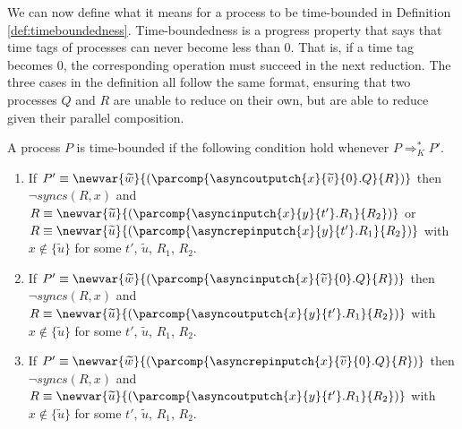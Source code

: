 We can now define what it means for a process to be time-bounded in Definition \ref{def:timeboundedness}. Time-boundedness is a progress property that says that time tags of processes can never become less than 0. That is, if a time tag becomes 0, the corresponding operation must succeed in the next reduction. The three cases in the definition all follow the same format, ensuring that two processes $Q$ and $R$ are unable to reduce on their own, but are able to reduce given their parallel composition.

\begin{defi}
    A process $P$ is time-bounded if the following condition hold whenever $P \Rightarrow^*_K P'$.
    \begin{enumerate}
        \item If $P' \equiv \newvar{\widetilde{w}}{(\parcomp{\asyncoutputch{x}{\widetilde{v}}{0}.Q}{R})}$ then $\neg syncs(R, x)$ and $R \equiv \newvar{\widetilde{u}}{(\parcomp{\asyncinputch{x}{y}{t'}.R_1}{R_2})}$ or $R \equiv \newvar{\widetilde{u}}{(\parcomp{\asyncrepinputch{x}{y}{t'}.R_1}{R_2})}$ with $x \not\in \{\widetilde{u}\}$ for some $t'$, $\widetilde{{u}}$, $R_1$, $R_2$.  
        \item If $P' \equiv \newvar{\widetilde{w}}{(\parcomp{\asyncinputch{x}{\widetilde{v}}{0}.Q}{R})}$ then $\neg syncs(R, x)$ and $R \equiv \newvar{\widetilde{u}}{(\parcomp{\asyncoutputch{x}{y}{t'}.R_1}{R_2})}$ with $x \not\in \{\widetilde{u}\}$ for some $t'$, $\widetilde{{u}}$, $R_1$, $R_2$.  
        \item If $P' \equiv \newvar{\widetilde{w}}{(\parcomp{\asyncrepinputch{x}{\widetilde{v}}{0}.Q}{R})}$ then $\neg syncs(R, x)$ and $R \equiv \newvar{\widetilde{u}}{(\parcomp{\asyncoutputch{x}{y}{t'}.R_1}{R_2})}$ with $x \not\in \{\widetilde{u}\}$ for some $t'$, $\widetilde{{u}}$, $R_1$, $R_2$.      \end{enumerate}
\label{def:timeboundedness}
\end{defi}


